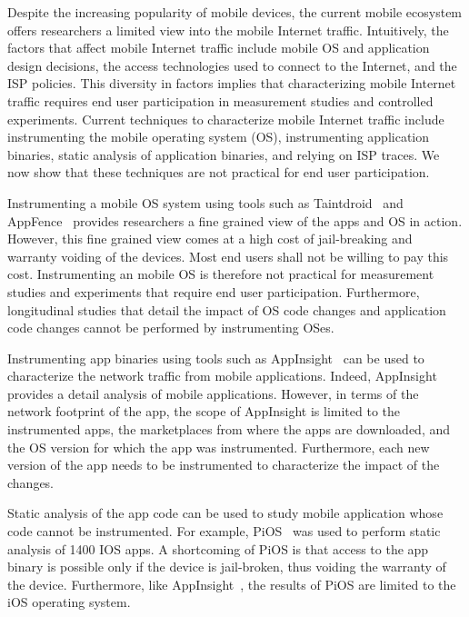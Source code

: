 Despite the increasing popularity of mobile devices, the current mobile ecosystem offers researchers a limited view into the mobile Internet traffic.
Intuitively, the factors that affect mobile Internet traffic include mobile OS and application design decisions, the access technologies used to connect to the Internet, and the ISP policies. 
This diversity in factors implies that characterizing mobile Internet traffic requires end user participation in measurement studies and controlled experiments.
Current techniques to characterize mobile Internet traffic include instrumenting the mobile operating system (OS), instrumenting application binaries, static analysis of application binaries, and relying on ISP traces. 
We now show that these techniques are not practical for end user participation.

Instrumenting a mobile OS system using tools such as Taintdroid~\cite{enck:taintdroid} and AppFence~\cite{hornyack:appfence} provides researchers a fine grained view of the apps and OS in action. 
However, this fine grained view comes at a high cost of jail-breaking and warranty voiding of the devices.
Most end users shall not be willing to pay this cost. 
Instrumenting an mobile OS is therefore not practical for measurement studies and experiments that require end user participation. 
Furthermore, longitudinal studies that detail the impact of OS code changes and application code changes cannot be performed by instrumenting OSes.

Instrumenting app binaries using tools such as AppInsight~\cite{ravindranath:appinsight} can be used to characterize the network traffic from mobile applications. 
Indeed, AppInsight provides a detail analysis of mobile applications.
However, in terms of the network footprint of the app, the scope of AppInsight is limited to the instrumented apps, the marketplaces from where the apps are downloaded, and the OS version for which the app was instrumented.
Furthermore, each new version of the app needs to be instrumented to characterize the impact of the changes.

Static analysis of the app code can be used to study mobile application whose code cannot be instrumented. 
For example, PiOS~\cite{egele:pios} was used to perform static analysis of 1400 IOS apps. 
A shortcoming of PiOS is that access to the app binary is possible only if the device is jail-broken, thus voiding the warranty of the device.
Furthermore, like AppInsight~\cite{ravindranath:appinsight}, the results of PiOS are limited to the iOS operating system. 

